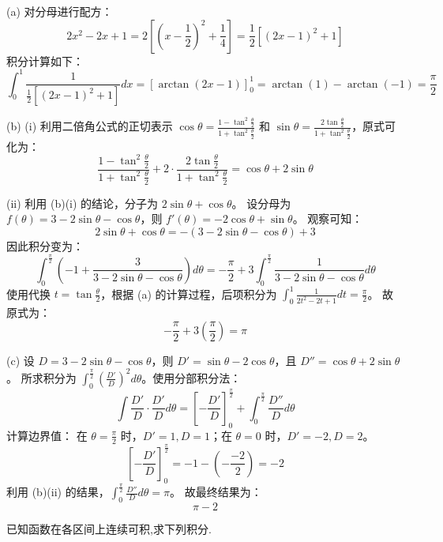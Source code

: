 \begin{questions}
\begin{solution}
(a) 
对分母进行配方：
\[
2x^2 - 2x + 1 = 2 \left[ \left( x - \frac{1}{2} \right)^2 + \frac{1}{4} \right] = \frac{1}{2} \left[ (2x - 1)^2 + 1 \right]
\]
积分计算如下：
\[
\int_{0}^{1} \frac{1}{\frac{1}{2} \left[ (2x - 1)^2 + 1 \right]} dx = \left[ \arctan(2x - 1) \right]_{0}^{1} = \arctan(1) - \arctan(-1) = \frac{\pi}{2}
\]

(b) (i) 
利用二倍角公式的正切表示 $\cos \theta = \frac{1 - \tan^2 \frac{\theta}{2}}{1 + \tan^2 \frac{\theta}{2}}$ 和 $\sin \theta = \frac{2 \tan \frac{\theta}{2}}{1 + \tan^2 \frac{\theta}{2}}$，原式可化为：
\[
\frac{1 - \tan^2 \frac{\theta}{2}}{1 + \tan^2 \frac{\theta}{2}} + 2 \cdot \frac{2 \tan \frac{\theta}{2}}{1 + \tan^2 \frac{\theta}{2}} = \cos \theta + 2 \sin \theta
\]

(ii) 
利用 (b)(i) 的结论，分子为 $2 \sin \theta + \cos \theta$。
设分母为 $f(\theta) = 3 - 2 \sin \theta - \cos \theta$，则 $f'(\theta) = -2 \cos \theta + \sin \theta$。
观察可知：
\[
2 \sin \theta + \cos \theta = - (3 - 2 \sin \theta - \cos \theta) + 3
\]
因此积分变为：
\[
\int_{0}^{\frac{\pi}{2}} \left( -1 + \frac{3}{3 - 2 \sin \theta - \cos \theta} \right) d\theta = - \frac{\pi}{2} + 3 \int_{0}^{\frac{\pi}{2}} \frac{1}{3 - 2 \sin \theta - \cos \theta} d\theta
\]
使用代换 $t = \tan \frac{\theta}{2}$，根据 (a) 的计算过程，后项积分为 $\int_{0}^{1} \frac{1}{2t^2 - 2t + 1} dt = \frac{\pi}{2}$。
故原式为：
\[
- \frac{\pi}{2} + 3 \left( \frac{\pi}{2} \right) = \pi
\]

(c) 
设 $D = 3 - 2 \sin \theta - \cos \theta$，则 $D' = \sin \theta - 2 \cos \theta$，且 $D'' = \cos \theta + 2 \sin \theta$。
所求积分为 $\int_{0}^{\frac{\pi}{2}} \left( \frac{D'}{D} \right)^2 d\theta$。使用分部积分法：
\[
\int \frac{D'}{D} \cdot \frac{D'}{D} d\theta = \left[ - \frac{D'}{D} \right]_{0}^{\frac{\pi}{2}} + \int_{0}^{\frac{\pi}{2}} \frac{D''}{D} d\theta
\]
计算边界值：
在 $\theta = \frac{\pi}{2}$ 时，$D' = 1, D = 1$；在 $\theta = 0$ 时，$D' = -2, D = 2$。
\[
\left[ - \frac{D'}{D} \right]_{0}^{\frac{\pi}{2}} = -1 - \left( - \frac{-2}{2} \right) = -2
\]
利用 (b)(ii) 的结果，$\int_{0}^{\frac{\pi}{2}} \frac{D''}{D} d\theta = \pi$。
故最终结果为：
\[
\pi - 2
\]
\end{solution}

\question 已知函数在各区间上连续可积,求下列积分.

\end{questions}
